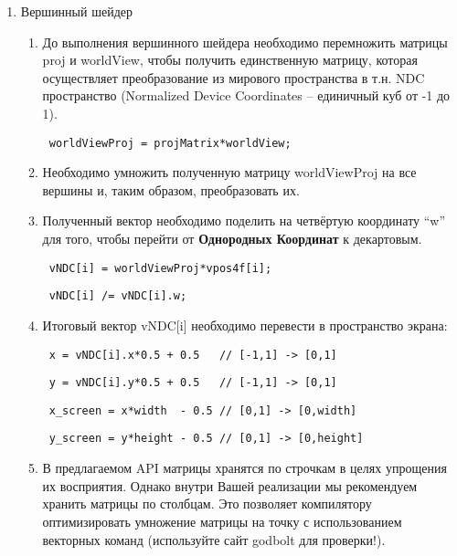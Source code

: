 \documentclass[12pt,subf,href,colorlinks=true]{article}
\begin{document}
\begin{enumerate}
\item Вершинный шейдер
\begin{enumerate}
  \item До выполнения вершинного шейдера необходимо перемножить матрицы proj и worldView, чтобы получить единственную матрицу, которая осуществляет преобразование из мирового пространства в т.н. NDC пространство (Normalized Device Coordinates -- единичный куб от -1 до 1).
  \begin{verbatim} worldViewProj = projMatrix*worldView; \end{verbatim}

  \item Необходимо умножить полученную матрицу worldViewProj на все вершины и, таким образом, преобразовать их.

  \item Полученный вектор необходимо поделить на четвёртую координату ``w'' для того, чтобы перейти от \textbf{Однородных Координат} \cite{ignatenkocoords} к декартовым.

  \begin{verbatim} vNDC[i] = worldViewProj*vpos4f[i];  \end{verbatim}
  \begin{verbatim} vNDC[i] /= vNDC[i].w; \end{verbatim}

  \item Итоговый вектор vNDC[i] необходимо перевести в пространство экрана:
  \begin{verbatim} x = vNDC[i].x*0.5 + 0.5   // [-1,1] -> [0,1]  \end{verbatim}
  \begin{verbatim} y = vNDC[i].y*0.5 + 0.5   // [-1,1] -> [0,1]  \end{verbatim}
  \begin{verbatim} x_screen = x*width  - 0.5 // [0,1] -> [0,width] \end{verbatim}
  \begin{verbatim} y_screen = y*height - 0.5 // [0,1] -> [0,height] \end{verbatim}

  \item В предлагаемом API матрицы хранятся по строчкам в целях упрощения их восприятия. Однако внутри Вашей реализации мы рекомендуем хранить матрицы по столбцам. Это позволяет компилятору оптимизировать умножение матрицы на точку с использованием векторных команд (используйте сайт godbolt \cite{godbolt} для проверки!).


\end{enumerate}
\end{enumerate}
\end{document}
